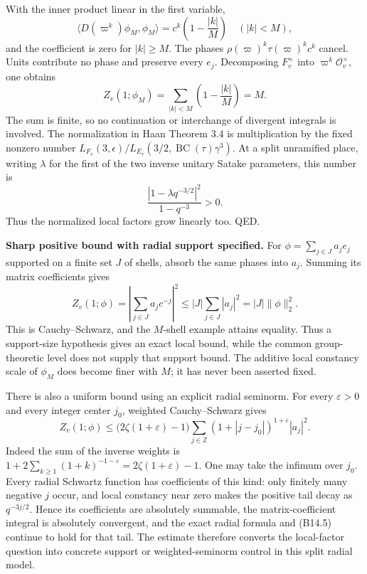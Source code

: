 With the inner product linear in the first variable, \[
 \langle D(\varpi^k)\phi_M,\phi_M\rangle
 =c^k\left(1-\frac{|k|}{M}\right)
 \quad (|k|<M),
\] and the coefficient is zero for \(|k|\ge M\). The phases \(\rho(\varpi)^k\tau(\varpi)^kc^k\) cancel. Units contribute no phase and preserve every \(e_j\). Decomposing \(F_v^\times\) into \(\varpi^k\mathcal O_v^\times\), one obtains \[
 Z_v(1;\phi_M)=\sum_{|k|<M}\left(1-\frac{|k|}{M}\right)=M.
\] The sum is finite, so no continuation or interchange of divergent integrals is involved. The normalization in Haan Theorem 3.4 is multiplication by the fixed nonzero number \(L_{F_v}(3,\epsilon)/L_{E_v}(3/2,\operatorname{BC}(\tau)\gamma^3)\). At a split unramified place, writing \(\lambda\) for the first of the two inverse unitary Satake parameters, this number is \[
 \frac{|1-\lambda q^{-3/2}|^2}{1-q^{-3}}>0.
\] Thus the normalized local factors grow linearly too. QED.

\textbf{Sharp positive bound with radial support specified.} For \(\phi=\sum_{j\in J}a_j e_j\) supported on a finite set \(J\) of shells, absorb the same phases into \(a_j\). Summing its matrix coefficients gives \[
 Z_v(1;\phi)=\left|\sum_{j\in J}a_jc^{-j}\right|^2
 \le |J|\sum_{j\in J}|a_j|^2
 =|J|\|\phi\|_2^2.
\tag{B14.3}
\] This is Cauchy--Schwarz, and the \(M\)-shell example attains equality. Thus a support-size hypothesis gives an exact local bound, while the common group-theoretic level does not supply that support bound. The additive local constancy scale of \(\phi_M\) does become finer with \(M\); it has never been asserted fixed.

There is also a uniform bound using an explicit radial seminorm. For every \(\varepsilon>0\) and every integer center \(j_0\), weighted Cauchy--Schwarz gives \[
 Z_v(1;\phi)\le
 \bigl(2\zeta(1+\varepsilon)-1\bigr)
 \sum_{j\in\mathbb Z}(1+|j-j_0|)^{1+\varepsilon}|a_j|^2.
\tag{B14.5}
\] Indeed the sum of the inverse weights is \(1+2\sum_{k\ge1}(1+k)^{-1-\varepsilon}=2\zeta(1+\varepsilon)-1\). One may take the infimum over \(j_0\). Every radial Schwartz function has coefficients of this kind: only finitely many negative \(j\) occur, and local constancy near zero makes the positive tail decay as \(q^{-3j/2}\). Hence its coefficients are absolutely summable, the matrix-coefficient integral is absolutely convergent, and the exact radial formula and (B14.5) continue to hold for that tail. The estimate therefore converts the local-factor question into concrete support or weighted-seminorm control in this split radial model.

